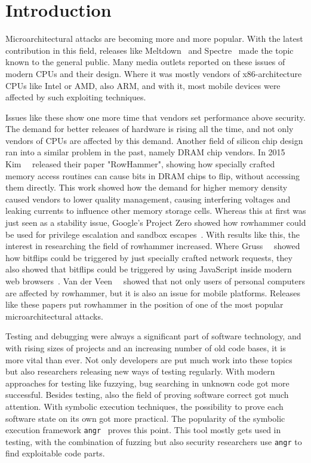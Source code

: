 \chapter{Introduction}\label{sec:intro}

Microarchitectural attacks are becoming more and more popular. With the latest
contribution in this field, releases like Meltdown~\cite{meltdown} and
Spectre~\cite{spectre} made the topic known to the general public. Many media
outlets reported on these issues of modern CPUs and their design. Where it was
mostly vendors of x86-architecture CPUs like Intel or AMD, also ARM, and with
it, most mobile devices were affected by such exploiting techniques.

Issues like these show one more time that vendors set performance above
security. The demand for better releases of hardware is rising all the time, and
not only vendors of CPUs are affected by this demand. Another field of silicon
chip design ran into a similar problem in the past, namely DRAM chip vendors. In
2015 Kim~\etal~\cite{rowhammergeneral} released their paper "RowHammer", showing
how specially crafted memory access routines can cause bits in DRAM chips to
flip, without accessing them directly. This work showed how the demand for
higher memory density caused vendors to lower quality management, causing
interfering voltages and leaking currents to influence other memory storage
cells. Whereas this at first was just seen as a stability issue, Google's
Project Zero showed how rowhammer could be used for privilege escalation and
sandbox escapes~\cite{projectzerorow}. With results like this, the interest in
researching the field of rowhammer increased. Where Gruss~\etal~\cite{nethammer}
showed how bitflips could be triggered by just specially crafted network
requests, they also showed that bitflips could be triggered by using JavaScript
inside modern web browsers~\cite{rowhammerjs}. Van der Veen~\etal~\cite{drammer}
showed that not only users of personal computers are affected by rowhammer, but
it is also an issue for mobile platforms. Releases like these papers put
rowhammer in the position of one of the most popular microarchitectural attacks.

Testing and debugging were always a significant part of software technology, and
with rising sizes of projects and an increasing number of old code bases, it is
more vital than ever. Not only developers are put much work into these
topics but also researchers releasing new ways of testing regularly. With modern
approaches for testing like fuzzying, bug searching in unknown code got more
successful. Besides testing, also the field of proving software correct got
much attention. With symbolic execution techniques, the possibility to prove
each software state on its own got more practical. The popularity of the
symbolic execution framework \texttt{angr}~\cite{angrpaper} proves this point.
This tool mostly gets used in testing, with the combination of fuzzing but also
security researchers use \texttt{angr} to find exploitable code parts.

